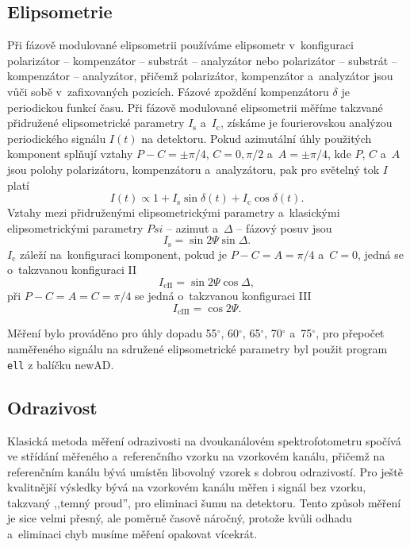 \subsection{Elipsometrie}
Při fázově modulované elipsometrii používáme elipsometr v~konfiguraci polarizátor -- kompenzátor -- substrát -- ana\-ly\-zátor nebo polarizátor -- substrát -- kompenzátor -- ana\-ly\-zátor, přičemž polarizátor, kompenzátor a~analyzátor jsou vůči sobě v~zafixovaných pozicích. Fázové zpoždění kompenzátoru $\delta$ je periodickou funkcí času. Při fázově mo\-du\-lo\-vané elipsometrii měříme takzvané přidružené elipsometrické parametry $I_\mathrm{s}$ a~$I_{\mathrm{c}}$, získáme je fourierovskou analýzou periodického signálu $I(t)$ na detektoru. Pokud azimutální úhly použitých komponent splňují vztahy $P - C = \pm \pi/4$, $C=0, \pi/2$ a~$A = \pm \pi/4$, kde $P$, $C$ a~$A$ jsou polohy polarizátoru, kompenzátoru a~analyzátoru, pak pro světelný tok $I$ platí \cite{Ohlidal2000}
%
\begin{equation} I(t) \propto 1 + I_\mathrm{s} \sin{\delta(t)} + I_\mathrm{c} \cos{\delta(t)} \mathrm{.}\end{equation}
%
Vztahy mezi přidruženými elipsometrickými parametry a~klasickými elipsometrickými parametry $Psi$ -- azimut a~$\Delta$ -- fázový posuv jsou  
\begin{equation} I_\mathrm{s} = \sin{2\Psi} \sin{\Delta} \mathrm{.}\end{equation}
$I_{\mathrm{c}}$ záleží na~konfiguraci komponent, pokud je $P - C = A = \pi/4$ a~$ C = 0 $, jedná se o~takzvanou konfiguraci II
\begin{equation} I_\mathrm{cII} = \sin{2\Psi} \cos{\Delta} \mathrm{,}\end{equation} 
při $P - C = A = C = \pi/4$ se jedná o~takzvanou konfiguraci III
\begin{equation} I_\mathrm{cIII} = \cos{2\Psi} \mathrm{.}\end{equation}

Měření bylo prováděno pro úhly dopadu 55$^\circ$, 60$^\circ$, 65$^\circ$, 70$^\circ$ a~75$^\circ$, pro přepočet naměřeného signálu na sdružené elipsometrické parametry byl použit program \texttt{ell} z balíčku newAD.

\subsection{Odrazivost}
Klasická metoda měření odrazivosti na dvoukanálovém spektrofotometru spočívá ve stří\-dá\-ní měřeného a~referenčního vzorku na vzorkovém kanálu, přičemž na referenčním kanálu bývá umístěn libovolný vzorek s dobrou odrazivostí. 
Pro ještě kvalitnější výsledky bývá na vzorkovém kanálu měřen i signál bez vzorku, takzvaný ,,temný proud'', pro eliminaci šumu na detektoru. Tento způsob měření je sice velmi přesný, ale poměrně časově náročný, protože kvůli odhadu a~eliminaci chyb musíme měření opakovat vícekrát.

